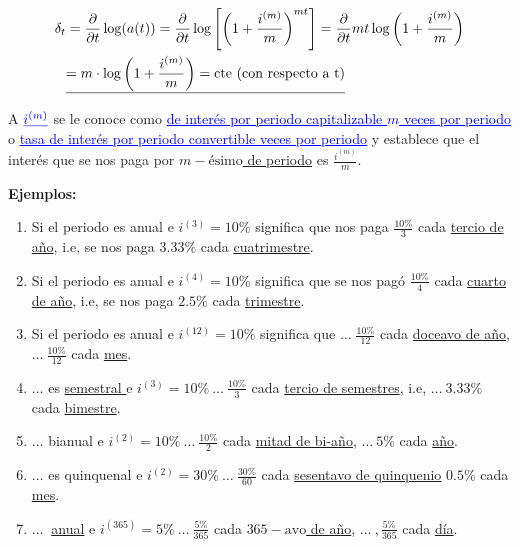 \begin{align*}
\delta_t&=\frac{\partial}{\partial t}\log(a(t)) = \frac{\partial}{\partial t}\log\left[\left( 1+\frac{i^{(m)}}{m}\right)^{mt}\right] = \frac{\partial}{\partial t}mt\log \left( 1+\frac{i^{(m)}}{m}\right)\\
&\underline{= m\cdot \log\left( 1+\frac{i^{(m)}}{m}\right) = \text{cte (con respecto a t)}}
\end{align*}

A $\textcolor{blue}{\underline{i^{(m)}}}$ se le conoce como \textcolor{blue}{\uline{ de interés por periodo capitalizable $m$ veces por periodo}}  o  \textcolor{blue}{\uline{tasa de interés por periodo convertible veces por periodo}} y establece que el interés que se nos paga por \uline{$m-\text{ésimo}$ de periodo} es $\frac{i^{(m)}}{m}$.

\textbf{Ejemplos:}
\begin{enumerate}[label=\protect\circled{\arabic*}]
\item Si el periodo es anual e $i^{(3)} = 10\%$ significa que nos paga $\frac{10\%}{3}$ cada \uline{tercio de año}, i.e, se nos paga $3.33\%$ cada \underline{cuatrimestre}.

\item Si el periodo es anual e $i^{(4)} = 10\%$ significa que se nos pagó $\frac{10\%}{4}$ cada \underline{cuarto de año}, i.e, se nos paga $2.5\%$ cada \underline{trimestre}.

\item Si el periodo es anual e $i^{(12)} = 10\%$ significa que $\ldots\; \frac{10\%}{12}$ cada \underline{doceavo de año}, $\ldots \:  \frac{10\%}{12}$ cada \underline{mes}.

\item $\ldots$ es \underline{semestral } e $i^{(3)} = 10\% \: \ldots \: \frac{10\%}{3}$ cada \underline{tercio de semestres}, i.e, $\ldots \: 3.33\%$ cada \underline{bimestre}.

\item $\ldots$ bianual e $i^{(2)} = 10\% \: \ldots \: \frac{10\%}{2}$ cada \underline{mitad de bi-año}, $\ldots \: 5\%$ cada \underline{año}.

\item $\ldots$ es quinquenal e $i^{(2)} = 30\% \: \ldots \: \frac{30\%}{60}$  cada \underline{sesentavo de quinquenio} $0.5\%$ cada \underline{mes}.

\item $\ldots \:$ \underline{anual} e $i^{(365)} = 5\% \: \ldots \: \frac{5\%}{365}$ cada \uline{$365-\text{avo}$ de año}, $\ldots\:, \frac{5\%}{365}$ cada \uline{día}. 
\end{enumerate}


